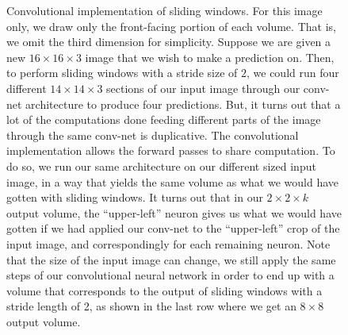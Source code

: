 \documentclass[12pt]{article}
\begin{document}
\begin{figure}[h]
  \caption{\footnotesize Convolutional implementation of sliding windows. For this image only, we draw only the front-facing portion of each volume. That is, we omit the third dimension for simplicity. Suppose we are given a new $16 \times 16 \times 3$ image that we wish to make a prediction on. Then, to perform sliding windows with a stride size of $2$, we could run four different $14 \times 14 \times 3$ sections of our input image through our conv-net architecture to produce four predictions. But, it turns out that a lot of the computations done feeding different parts of the image through the same conv-net is duplicative. The convolutional implementation allows the forward passes to share computation. To do so, we run our same architecture on our different sized input image, in a way that yields the same volume as what we would have gotten with sliding windows. It turns out that in our $2 \times 2 \times k$ output volume, the ``upper-left'' neuron gives us what we would have gotten if we had applied our conv-net to the ``upper-left'' crop of the input image, and correspondingly for each remaining neuron. Note that the size of the input image can change, we still apply the same steps of our convolutional neural network in order to end up with a volume that corresponds to the output of sliding windows with a stride length of 2,
as shown in the last row where we get an $8 \times 8$ output volume.
}
\end{figure}
\end{document}
